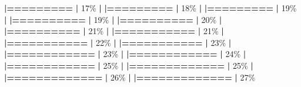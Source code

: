 \documentclass[
]{book}
\newenvironment{Shaded}{\begin{snugshade}}{\end{snugshade}}
\newcommand{\DecValTok}[1]{\textcolor[rgb]{0.00,0.00,0.81}{#1}}
\newcommand{\ErrorTok}[1]{\textcolor[rgb]{0.64,0.00,0.00}{\textbf{#1}}}
\newcommand{\NormalTok}[1]{#1}
\newcommand{\SpecialCharTok}[1]{\textcolor[rgb]{0.81,0.36,0.00}{\textbf{#1}}}
\begin{document}
\begin{Shaded}
\begin{Highlighting}[]
  \ErrorTok{|=========}                                         \ErrorTok{|}  \DecValTok{17}\NormalTok{\%}
  \SpecialCharTok{|}                                                        
  \ErrorTok{|=========}                                         \ErrorTok{|}  \DecValTok{18}\NormalTok{\%}
  \SpecialCharTok{|}                                                        
  \ErrorTok{|=========}                                         \ErrorTok{|}  \DecValTok{19}\NormalTok{\%}
  \SpecialCharTok{|}                                                        
  \ErrorTok{|==========}                                        \ErrorTok{|}  \DecValTok{19}\NormalTok{\%}
  \SpecialCharTok{|}                                                        
  \ErrorTok{|==========}                                        \ErrorTok{|}  \DecValTok{20}\NormalTok{\%}
  \SpecialCharTok{|}                                                        
  \ErrorTok{|==========}                                        \ErrorTok{|}  \DecValTok{21}\NormalTok{\%}
  \SpecialCharTok{|}                                                        
  \ErrorTok{|===========}                                       \ErrorTok{|}  \DecValTok{21}\NormalTok{\%}
  \SpecialCharTok{|}                                                        
  \ErrorTok{|===========}                                       \ErrorTok{|}  \DecValTok{22}\NormalTok{\%}
  \SpecialCharTok{|}                                                        
  \ErrorTok{|===========}                                       \ErrorTok{|}  \DecValTok{23}\NormalTok{\%}
  \SpecialCharTok{|}                                                        
  \ErrorTok{|============}                                      \ErrorTok{|}  \DecValTok{23}\NormalTok{\%}
  \SpecialCharTok{|}                                                        
  \ErrorTok{|============}                                      \ErrorTok{|}  \DecValTok{24}\NormalTok{\%}
  \SpecialCharTok{|}                                                        
  \ErrorTok{|============}                                      \ErrorTok{|}  \DecValTok{25}\NormalTok{\%}
  \SpecialCharTok{|}                                                        
  \ErrorTok{|=============}                                     \ErrorTok{|}  \DecValTok{25}\NormalTok{\%}
  \SpecialCharTok{|}                                                        
  \ErrorTok{|=============}                                     \ErrorTok{|}  \DecValTok{26}\NormalTok{\%}
  \SpecialCharTok{|}                                                        
  \ErrorTok{|=============}                                     \ErrorTok{|}  \DecValTok{27}\NormalTok{\%}

\end{Highlighting}
\end{Shaded}
\end{document}
